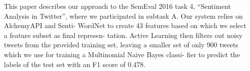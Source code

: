 This paper describes our approach to the SemEval 2016 task 4, ``Sentiment Analysis in Twitter'', where we participated in subtask A. Our system relies on AlchemyAPI and Senti- WordNet to create 43 features based on which we select a feature subset as final represen- tation. Active Learning then filters out noisy tweets from the provided training set, leaving a smaller set of only 900 tweets which we use for training a Multinomial Naive Bayes classi- fier to predict the labels of the test set with an F1 score of 0.478.
